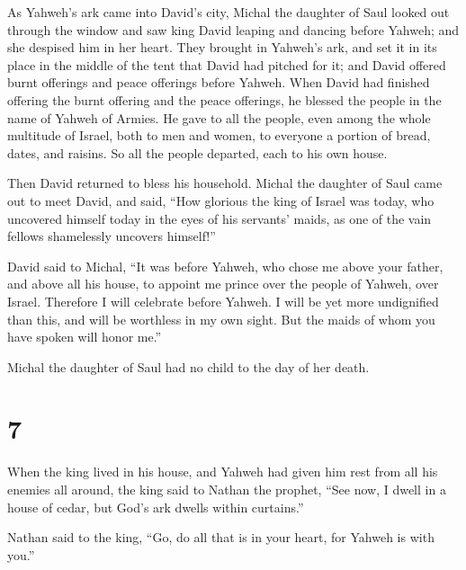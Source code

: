  As Yahweh's ark came into David's city, Michal the
daughter of Saul looked out through the window and saw king David
leaping and dancing before Yahweh; and she despised him in her heart.
 They brought in Yahweh's ark, and set it in its place in
the middle of the tent that David had pitched for it; and David offered
burnt offerings and peace offerings before Yahweh.  When
David had finished offering the burnt offering and the peace offerings,
he blessed the people in the name of Yahweh of Armies. 
He gave to all the people, even among the whole multitude of Israel,
both to men and women, to everyone a portion of bread, dates, and
raisins. So all the people departed, each to his own house.

 Then David returned to bless his household. Michal the
daughter of Saul came out to meet David, and said, ``How glorious the
king of Israel was today, who uncovered himself today in the eyes of his
servants' maids, as one of the vain fellows shamelessly uncovers
himself!''

 David said to Michal, ``It was before Yahweh, who chose
me above your father, and above all his house, to appoint me prince over
the people of Yahweh, over Israel. Therefore I will celebrate before
Yahweh.  I will be yet more undignified than this, and
will be worthless in my own sight. But the maids of whom you have spoken
will honor me.''

 Michal the daughter of Saul had no child to the day of
her death.

\hypertarget{section-6}{%
\section{7}\label{section-6}}

 When the king lived in his house, and Yahweh had given
him rest from all his enemies all around,  the king said
to Nathan the prophet, ``See now, I dwell in a house of cedar, but God's
ark dwells within curtains.''

 Nathan said to the king, ``Go, do all that is in your
heart, for Yahweh is with you.''

